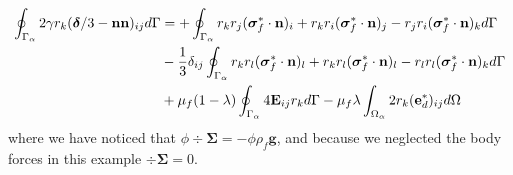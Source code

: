 \begin{align}
    \intS{2\gamma r_{k}(\bm\delta/3 - \textbf{nn})_{ij}}
    &= 
    +\intS{
        r_{k}r_{j} (\bm{\sigma}^*_f\cdot\textbf{n})_i 
        + r_{k}r_{i} (\bm{\sigma}^*_f\cdot\textbf{n})_j 
        - r_{j}r_{i} (\bm{\sigma}^*_f\cdot\textbf{n})_k 
    }\nonumber \\
    &-\frac{1}{3}\delta_{ij}\intS{
        r_{k}r_{l} (\bm{\sigma}^*_f\cdot\textbf{n})_l
        + r_{k}r_{l} (\bm{\sigma}^*_f\cdot\textbf{n})_l 
        - r_{l}r_{l} (\bm{\sigma}^*_f\cdot\textbf{n})_k 
    }\nonumber \\
    &+\mu_f (1-\lambda)\intS{ 4\textbf{E}_{ij} r_{k}  }
    - \mu_f\lambda \intO{2 r_{k}(\textbf{e}_d^*)_{ij}}
    \label{eq:second_mom}
\end{align}
where we have noticed that $\phi \div\bm\Sigma = - \phi \rho_f \textbf{g}$, and because we neglected the body forces in this example  $\div\bm\Sigma =0$. 


